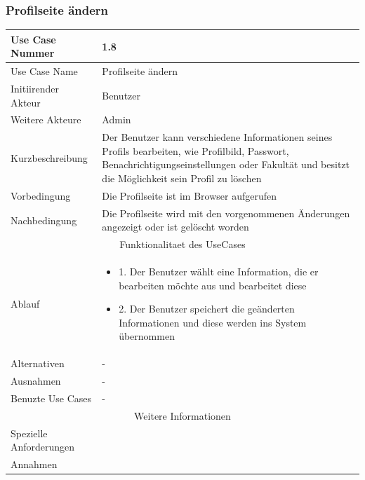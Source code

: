\documentclass[10pt,a4paper]{article}
\begin{document}
	\subsubsection{Profilseite \"andern}
		\begin{tabular}{|l|p{.5\linewidth}|}
		\hline Use Case Nummer & 1.8 \\ 
		\hline Use Case Name & Profilseite \"andern \\ 
		\hline Initiirender Akteur & Benutzer \\
		\hline Weitere Akteure & Admin \\
		\hline Kurzbeschreibung & Der Benutzer kann verschiedene Informationen seines Profils bearbeiten, wie Profilbild, Passwort, Benachrichtigungseinstellungen oder Fakultät und besitzt die Möglichkeit sein Profil zu löschen \\
		\hline Vorbedingung & Die Profilseite ist im Browser aufgerufen \\
		\hline Nachbedingung & Die Profilseite wird mit den vorgenommenen \"Anderungen angezeigt oder ist gel\"oscht worden \\
		\hline \multicolumn{2}{|c|}{Funktionalitaet des UseCases}\\
		\hline Ablauf & \begin{itemize}
					\item 1. Der Benutzer w\"ahlt eine Information, die er bearbeiten m\"ochte aus und bearbeitet diese
					\item 2. Der Benutzer speichert die ge\"anderten Informationen und diese werden ins System \"ubernommen
				\end{itemize}\\
		\hline Alternativen & - \\
		\hline Ausnahmen & - \\
		\hline Benuzte Use Cases & - \\
		\hline \multicolumn{2}{|c|}{Weitere Informationen} \\
		\hline Spezielle Anforderungen &  \\
		\hline Annahmen &  \\
		\hline
		\end{tabular}
		
\end{document}
